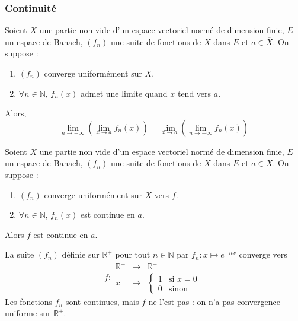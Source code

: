 	\subsubsection{Continuité}
	
	
	\begin{theorem}
		Soient $X$ une partie non vide d'un espace vectoriel normé de dimension finie, $E$ un espace de Banach, $(f_n)$ une suite de fonctions de $X$ dans $E$ et $a \in \overline{X}$. On suppose :
		\begin{enumerate}[label=(\roman*)]
			\item $(f_n)$ converge uniformément sur $X$.
			\item $\forall n \in \mathbb{N}, \, f_n(x)$ admet une limite quand $x$ tend vers $a$.
		\end{enumerate}
		Alors,
		\[ \lim_{n \rightarrow +\infty} \left( \lim_{x \rightarrow a} f_n(x) \right) = \lim_{x \rightarrow a} \left( \lim_{n \rightarrow +\infty} f_n(x) \right) \]
	\end{theorem}
	
	\begin{theorem}
		Soient $X$ une partie non vide d'un espace vectoriel normé de dimension finie, $E$ un espace de Banach, $(f_n)$ une suite de fonctions de $X$ dans $E$ et $a \in X$. On suppose :
		\begin{enumerate}[label=(\roman*)]
			\item $(f_n)$ converge uniformément sur $X$ vers $f$.
			\item $\forall n \in \mathbb{N}, \, f_n(x)$ est continue en $a$.
		\end{enumerate}
		Alors $f$ est continue en $a$.
	\end{theorem}
	
	\begin{example}
		La suite $(f_n)$ définie sur $\mathbb{R}^+$ pour tout $n \in \mathbb{N}$ par $f_n : x \mapsto e^{-nx}$ converge vers
		\[
		f :
		\begin{array}{ccc}
			\mathbb{R}^+ &\rightarrow& \mathbb{R}^+ \\
			x &\mapsto& \begin{cases}
				1 &\text{si } x = 0 \\
				0 &\text{sinon}
			\end{cases}
		\end{array}
		\]
		Les fonctions $f_n$ sont continues, mais $f$ ne l'est pas : on n'a pas convergence uniforme sur $\mathbb{R}^+$.
	\end{example}
	
